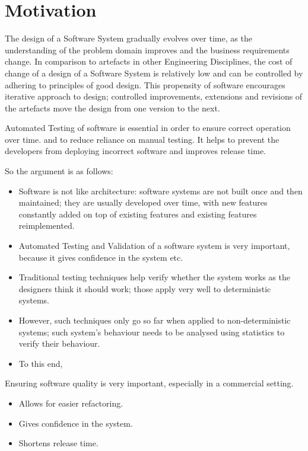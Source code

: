 \section{Motivation}

The design of a Software System gradually evolves over time, as the understanding of the problem domain improves and the business requirements change. In comparison to artefacts in other Engineering Disciplines, the cost of change of a design of a Software System is relatively low and can be controlled by adhering to principles of good design. This propensity of software encourages iterative approach to design; controlled improvements, extensions and revisions of the artefacts move the design from one version to the next. 

Automated Testing of software is essential in order to ensure correct operation over time. and to reduce reliance on manual testing. It helps to prevent the developers from deploying incorrect software and improves release time.

So the argument is as follows:
\begin{itemize}
\item Software is not like architecture: software systems are not built once and then maintained; they are usually developed over time, with new features constantly added on top of existing features and existing features reimplemented.
\item Automated Testing and Validation of a software system is very important, because it gives confidence in the system etc.
\item Traditional testing techniques help verify whether the system works as the designers think it should work; those apply very well to deterministic systems.
\item However, such techniques only go so far when applied to non-deterministic systems; such system's behaviour needs to be analysed using statistics to verify their behaviour.
\item To this end, 
\end{itemize}


Ensuring software quality is very important, especially in a commercial setting. 

\begin{itemize}
\item Allows for easier refactoring.
\item Gives confidence in the system.
\item Shortens release time. 
\end{itemize}
 
